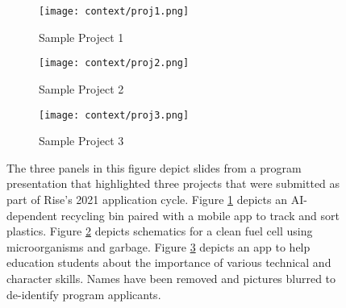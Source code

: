\begin{figure}[htbp]
    \centering
    \begin{subfigure}{.45\textwidth}
        \centering
        \texttt{[image: context/proj1.png]}
        \caption{Sample Project 1}
        \label{sfig:can}
    \end{subfigure}
    \hfill
    \vspace{1em}
    \begin{subfigure}{.45\textwidth}
        \centering
        \texttt{[image: context/proj2.png]}
        \caption{Sample Project 2}
        \label{sfig:cell}
    \end{subfigure}
    \hfill
    \vspace{1em}
    \begin{subfigure}{.45\textwidth}
        \centering
        \texttt{[image: context/proj3.png]} 
        \caption{Sample Project 3}
        \label{sfig:app}
    \end{subfigure}
    \caption{The three panels in this figure depict slides from a program presentation that highlighted three projects that were submitted as part of Rise's 2021 application cycle. Figure \ref{sfig:can} depicts an AI-dependent recycling bin paired with a mobile app to track and sort plastics. Figure \ref{sfig:cell} depicts schematics for a clean fuel cell using microorganisms and garbage. Figure \ref{sfig:app} depicts an app to help education students about the importance of various technical and character skills. Names have been removed and pictures blurred to de-identify program applicants.}
    \label{fig:example_projects}
\end{figure}


